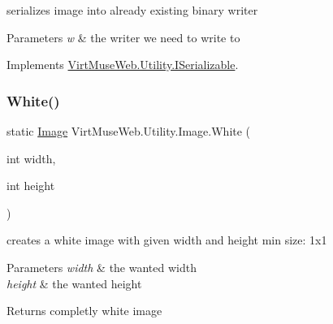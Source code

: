 serializes image into already existing binary writer 


\begin{DoxyParams}{Parameters}
{\em w} & the writer we need to write to\\
\hline
\end{DoxyParams}


Implements \mbox{\hyperlink{interface_virt_muse_web_1_1_utility_1_1_i_serializable_a99aed8cf41a4ed3ff1ccbedf84d89291}{Virt\+Muse\+Web.\+Utility.\+I\+Serializable}}.

\mbox{\label{class_virt_muse_web_1_1_utility_1_1_image_a2d472e394459543eddfdfe5dd2c14d7b}} 
\subsubsection{\texorpdfstring{White()}{White()}}
{\footnotesize\ttfamily static \mbox{\hyperlink{class_virt_muse_web_1_1_utility_1_1_image}{Image}} Virt\+Muse\+Web.\+Utility.\+Image.\+White (\begin{DoxyParamCaption}\item[{int}]{width,  }\item[{int}]{height }\end{DoxyParamCaption})\hspace{0.3cm}{\ttfamily [static]}}



creates a white image with given width and height min size\+: 1x1 


\begin{DoxyParams}{Parameters}
{\em width} & the wanted width\\
\hline
{\em height} & the wanted height\\
\hline
\end{DoxyParams}
\begin{DoxyReturn}{Returns}
completly white image
\end{DoxyReturn}
\mbox{\label{class_virt_muse_web_1_1_utility_1_1_image_aa4740b3d049ec78a42d90c539ee4b186}} 
